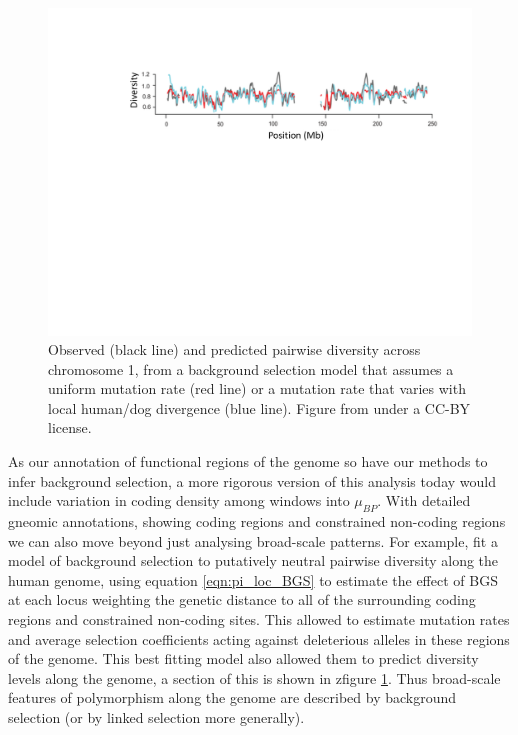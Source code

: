 
\begin{figure}
\begin{center}
\includegraphics[width=\textwidth]{Journal_figs/recom_selection/McVicker_human_BGS/McVicker_human_BGS.pdf}
\end{center}
\caption{Observed (black line) and predicted pairwise diversity across
  chromosome 1, from a background selection model that assumes a
  uniform mutation rate (red line) or a mutation rate that varies with
  local human/dog divergence (blue line). Figure from
  \citep{Mcvicker:09} under a CC-BY license. } \label{fig:McVicker_BGS}
\end{figure}

As our annotation of functional regions of the genome so have our
methods to infer background selection, a more rigorous version of this analysis today would include variation in coding density among
windows into $\mu_{BP}$. With detailed gneomic annotations, showing
coding regions and constrained non-coding regions we can also move
beyond just analysing broad-scale patterns. For example,
\citet{Mcvicker:09} fit a model of background selection to putatively
neutral pairwise diversity along the human genome, using equation
\ref{eqn:pi_loc_BGS} to estimate the effect of BGS at each locus
weighting the genetic distance to all of the surrounding coding
regions and constrained non-coding sites. This allowed
\citet{Mcvicker:09} to estimate mutation rates and average selection
coefficients acting against deleterious alleles in these regions of
the genome. This best fitting model also allowed them to predict
diversity levels along the genome, a section of this is shown in
zfigure \ref{fig:McVicker_BGS}. Thus broad-scale features of
polymorphism along the genome are described by background selection
(or by linked selection more generally).

